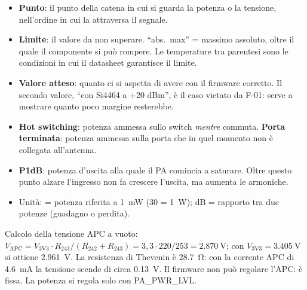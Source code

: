 \begin{nota}
\begin{itemize}
\item \textbf{Punto}: il punto della catena in cui si guarda la potenza o la tensione, nell'ordine in cui la attraversa il segnale.
\item \textbf{Limite}: il valore da non superare. \enquote{abs.\ max} = massimo assoluto, oltre il quale il componente si può rompere. Le temperature tra parentesi sono le condizioni in cui il datasheet garantisce il limite.
\item \textbf{Valore atteso}: quanto ci si aspetta di avere con il firmware corretto. Il secondo valore, \enquote{con Si4464 a +20 dBm}, è il caso vietato da F-01: serve a mostrare quanto poco margine resterebbe.
\item \textbf{Hot switching}: potenza ammessa sullo switch \emph{mentre} commuta. \textbf{Porta terminata}: potenza ammessa sulla porta che in quel momento non è collegata all'antenna.
\item \textbf{P1dB}: potenza d'uscita alla quale il PA comincia a saturare. Oltre questo punto alzare l'ingresso non fa crescere l'uscita, ma aumenta le armoniche.
\item Unità: \si{\dBm} = potenza riferita a \SI{1}{\milli\watt} (\SI{30}{\dBm} = \SI{1}{\watt}); \si{dB} = rapporto tra due potenze (guadagno o perdita).
\end{itemize}
\end{nota}

Calcolo della tensione APC a vuoto: $V_\text{APC} = V_\text{3V3}\cdot R_{243}/(R_{242}+R_{243}) = 3{,}3\cdot 220/253 = \SI{2.870}{\volt}$; con $V_\text{3V3} = \SI{3.405}{\volt}$ si ottiene \SI{2.961}{\volt}. La resistenza di Thevenin è \SI{28.7}{\ohm}: con la corrente APC di \SI{4.6}{\milli\ampere}  la tensione scende di circa \SI{0.13}{\volt}. Il firmware non può regolare l'APC: è fissa. La potenza si regola solo con PA\_PWR\_LVL.

